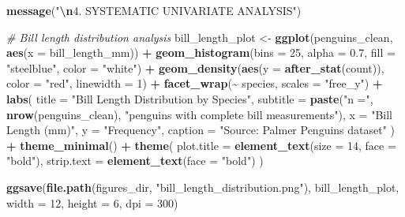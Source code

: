 \documentclass[
]{article}
\newenvironment{Shaded}{\begin{snugshade}}{\end{snugshade}}
\newcommand{\AttributeTok}[1]{\textcolor[rgb]{0.13,0.29,0.53}{#1}}
\newcommand{\CommentTok}[1]{\textcolor[rgb]{0.56,0.35,0.01}{\textit{#1}}}
\newcommand{\DecValTok}[1]{\textcolor[rgb]{0.00,0.00,0.81}{#1}}
\newcommand{\FloatTok}[1]{\textcolor[rgb]{0.00,0.00,0.81}{#1}}
\newcommand{\FunctionTok}[1]{\textcolor[rgb]{0.13,0.29,0.53}{\textbf{#1}}}
\newcommand{\NormalTok}[1]{#1}
\newcommand{\OtherTok}[1]{\textcolor[rgb]{0.56,0.35,0.01}{#1}}
\newcommand{\SpecialCharTok}[1]{\textcolor[rgb]{0.81,0.36,0.00}{\textbf{#1}}}
\newcommand{\StringTok}[1]{\textcolor[rgb]{0.31,0.60,0.02}{#1}}
\begin{document}
\begin{Shaded}
\begin{Highlighting}[]
\FunctionTok{message}\NormalTok{(}\StringTok{"}\SpecialCharTok{\textbackslash{}n}\StringTok{4. SYSTEMATIC UNIVARIATE ANALYSIS"}\NormalTok{)}

\CommentTok{\# Bill length distribution analysis}
\NormalTok{bill\_length\_plot }\OtherTok{\textless{}{-}} \FunctionTok{ggplot}\NormalTok{(penguins\_clean, }\FunctionTok{aes}\NormalTok{(}\AttributeTok{x =}\NormalTok{ bill\_length\_mm)) }\SpecialCharTok{+}
  \FunctionTok{geom\_histogram}\NormalTok{(}\AttributeTok{bins =} \DecValTok{25}\NormalTok{, }\AttributeTok{alpha =} \FloatTok{0.7}\NormalTok{, }\AttributeTok{fill =} \StringTok{"steelblue"}\NormalTok{, }\AttributeTok{color =} \StringTok{"white"}\NormalTok{) }\SpecialCharTok{+}
  \FunctionTok{geom\_density}\NormalTok{(}\FunctionTok{aes}\NormalTok{(}\AttributeTok{y =} \FunctionTok{after\_stat}\NormalTok{(count)), }\AttributeTok{color =} \StringTok{"red"}\NormalTok{, }\AttributeTok{linewidth =} \DecValTok{1}\NormalTok{) }\SpecialCharTok{+}
  \FunctionTok{facet\_wrap}\NormalTok{(}\SpecialCharTok{\textasciitilde{}}\NormalTok{ species, }\AttributeTok{scales =} \StringTok{"free\_y"}\NormalTok{) }\SpecialCharTok{+}
  \FunctionTok{labs}\NormalTok{(}
    \AttributeTok{title =} \StringTok{"Bill Length Distribution by Species"}\NormalTok{,}
    \AttributeTok{subtitle =} \FunctionTok{paste}\NormalTok{(}\StringTok{"n ="}\NormalTok{, }\FunctionTok{nrow}\NormalTok{(penguins\_clean), }\StringTok{"penguins with complete bill measurements"}\NormalTok{),}
    \AttributeTok{x =} \StringTok{"Bill Length (mm)"}\NormalTok{,}
    \AttributeTok{y =} \StringTok{"Frequency"}\NormalTok{,}
    \AttributeTok{caption =} \StringTok{"Source: Palmer Penguins dataset"}
\NormalTok{  ) }\SpecialCharTok{+}
  \FunctionTok{theme\_minimal}\NormalTok{() }\SpecialCharTok{+}
  \FunctionTok{theme}\NormalTok{(}
    \AttributeTok{plot.title =} \FunctionTok{element\_text}\NormalTok{(}\AttributeTok{size =} \DecValTok{14}\NormalTok{, }\AttributeTok{face =} \StringTok{"bold"}\NormalTok{),}
    \AttributeTok{strip.text =} \FunctionTok{element\_text}\NormalTok{(}\AttributeTok{face =} \StringTok{"bold"}\NormalTok{)}
\NormalTok{  )}

\FunctionTok{ggsave}\NormalTok{(}\FunctionTok{file.path}\NormalTok{(figures\_dir, }\StringTok{"bill\_length\_distribution.png"}\NormalTok{),}
\NormalTok{       bill\_length\_plot, }\AttributeTok{width =} \DecValTok{12}\NormalTok{, }\AttributeTok{height =} \DecValTok{6}\NormalTok{, }\AttributeTok{dpi =} \DecValTok{300}\NormalTok{)}


\end{Highlighting}
\end{Shaded}
\end{document}
